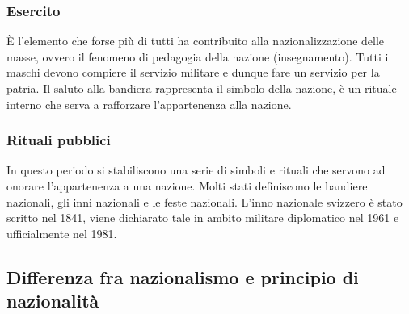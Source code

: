 \documentclass[a4paper]{article}
\begin{document}
\subsubsection{Esercito}

È l'elemento che forse più di tutti ha contribuito alla nazionalizzazione delle masse,
ovvero il fenomeno di pedagogia della nazione (insegnamento).
Tutti i maschi devono compiere il servizio militare e dunque fare un servizio per la patria.
Il saluto alla bandiera rappresenta il simbolo della nazione, è un rituale
interno che serva a rafforzare l'appartenenza alla nazione.

\subsubsection{Rituali pubblici}

In questo periodo si stabiliscono una serie di simboli e rituali che servono ad onorare
l'appartenenza a una nazione. Molti stati definiscono le bandiere nazionali, gli inni nazionali
e le feste nazionali. L'inno nazionale svizzero è stato scritto nel 1841, viene dichiarato tale
in ambito militare diplomatico nel 1961 e ufficialmente nel 1981.

\pagebreak

\subsection{Differenza fra nazionalismo e principio di nazionalità}
\end{document}
